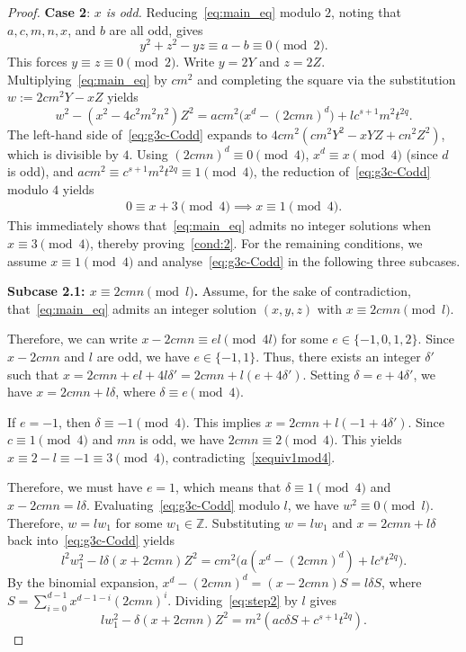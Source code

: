 \documentclass[11pt,a4paper]{amsart}
\newcommand{\ZZ}{\mathbb{Z}}
\theoremstyle{plain}
\theoremstyle{definition}
\begin{document}
\begin{proof}
\medskip
\noindent\textbf{Case 2}: \textit{$x$ is odd.}\quad
Reducing~\eqref{eq:main_eq} modulo $2$, noting that $a,c,m,n,x$, and $b$ are all odd, gives
\[
y^{2} + z^{2} - yz \equiv a-b\equiv 0 \pmod 2.
\]
This forces $y \equiv z \equiv 0 \pmod 2$. Write $y = 2Y$ and $z = 2Z$. Multiplying~\eqref{eq:main_eq} by $cm^{2}$ and completing the square via the substitution $w := 2cm^{2}Y - x Z$ yields
\begin{equation}\label{eq:g3c-Codd}
w^{2} - (x^{2}-4c^{2}m^{2}n^{2})Z^{2} = acm^{2}\bigl(x^{d}-(2cmn)^{d}\bigr) + lc^{s+1}m^{2}t^{2q}.
\end{equation}
The left-hand side of~\eqref{eq:g3c-Codd} expands to $4cm^{2}(cm^{2}Y^{2}-x YZ+cn^{2}Z^{2})$, which is divisible by $4$. Using $(2cmn)^{d} \equiv 0 \pmod 4$, $x^{d} \equiv x \pmod 4$ (since $d$ is odd), and $acm^{2} \equiv c^{s+1}m^{2}t^{2q} \equiv 1 \pmod 4$, the reduction of~\eqref{eq:g3c-Codd} modulo $4$ yields 
\begin{align}\label{xequiv1mod4}
0 \equiv x + 3 \pmod 4 \implies x \equiv 1 \pmod 4.
\end{align}
This immediately shows that~\eqref{eq:main_eq} admits no integer solutions when $x \equiv 3 \pmod 4$, thereby proving~\ref{cond:2}. For the remaining conditions, we assume $x \equiv 1 \pmod 4$ and analyse~\eqref{eq:g3c-Codd} in the following three subcases.

\medskip
\noindent\textbf{Subcase 2.1: $x \equiv 2cmn \pmod l$.}\quad
Assume, for the sake of contradiction, that~\eqref{eq:main_eq} admits an integer solution $(x, y, z)$ with $x \equiv 2cmn \pmod l$.

Therefore, we can write $x - 2cmn \equiv el \pmod{4l}$ for some $e \in \{-1,0, 1, 2 \}$. Since $x - 2cmn$ and $l$ are odd, we have $e \in \{-1, 1\}$. Thus, there exists an integer $\delta'$ such that $x = 2cmn + el + 4l\delta' = 2cmn + l(e + 4\delta')$. Setting $\delta = e + 4\delta'$, we have $x = 2cmn + l\delta$, where $\delta \equiv e \pmod 4$.

If $e = -1$, then $\delta \equiv -1 \pmod 4$. This implies $x = 2cmn + l(-1 + 4\delta')$. Since $c \equiv 1 \pmod 4$ and $mn $ is odd, we have $2cmn \equiv 2 \pmod 4$. This yields $x \equiv 2 - l \equiv  -1 \equiv 3 \pmod 4$, contradicting~\eqref{xequiv1mod4}.

Therefore, we must have $e = 1$, which means that $\delta \equiv 1 \pmod 4$ and $x - 2cmn=l\delta$. Evaluating~\eqref{eq:g3c-Codd} modulo $l$, we have $w^2 \equiv 0 \pmod l$. Therefore, $w = lw_1$ for some $w_1 \in \ZZ$. Substituting $w = lw_1$ and $x = 2cmn + l\delta$ back into~\eqref{eq:g3c-Codd} yields
\begin{equation}\label{eq:step2}
l^2 w_1^2 - l\delta(x + 2cmn)Z^2 = c m^{2}\big( a(x^d - (2cmn)^d) + l c^s t^{2q} \big).
\end{equation}
By the binomial expansion, $x^d - (2cmn)^d = (x - 2cmn)S = l\delta S$, where $S = \displaystyle\sum_{i=0}^{d-1} x^{d-1-i}(2cmn)^i$. Dividing~\eqref{eq:step2} by $l$ gives
\begin{equation}\label{eq:step3}
l w_1^2 - \delta(x + 2cmn)Z^2 = m^{2}(ac\delta S + c^{s+1} t^{2q}).
\end{equation}


\end{proof}
\end{document}
